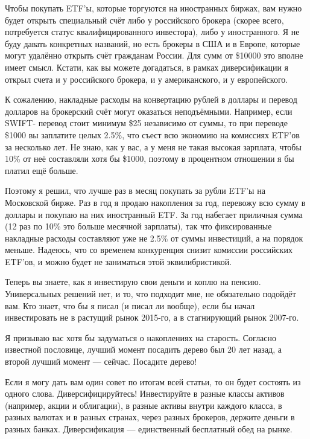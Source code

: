 Чтобы покупать ETF'ы, которые торгуются на иностранных биржах, вам нужно будет 
открыть специальный счёт либо у российского брокера (скорее всего, потребуется 
статус квалифицированного инвестора), либо у иностранного. Я не буду давать 
конкретных названий, но есть брокеры в США и в Европе, которые могут удалённо 
открыть счёт гражданам России. Для сумм от \$\num{10 000} это вполне имеет 
смысл. Кстати, как вы можете догадаться, в рамках диверсификации я открыл счета 
и у российского брокера, и у американского, и у европейского.

К сожалению, накладные расходы на конвертацию рублей в доллары и перевод 
долларов на брокерский счёт могут оказаться неподъёмными. Например, если SWIFT-
перевод стоит минимум \$25 независимо от суммы, то при переводе \$\num{1000} вы 
заплатите целых 2.5\%, что съест всю экономию на комиссиях ETF'ов за несколько 
лет. Не знаю, как у вас, а у меня не такая высокая зарплата, чтобы 10\% от неё 
составляли хотя бы \$\num{1000}, поэтому в процентном отношении я бы платил ещё 
больше.

Поэтому я решил, что лучше раз в месяц покупать за рубли ETF'ы на Московской 
бирже. Раз в год я продаю накопления за год, перевожу всю сумму в доллары и 
покупаю на них иностранный ETF. За год набегает приличная сумма (12 раз по 10\% 
это больше месячной зарплаты), так что фиксированные накладные расходы 
составляют уже не 2.5\% от суммы инвестиций, а на порядок меньше. Надеюсь, что 
со временем конкуренция снизит комиссии российских ETF'ов, и можно будет не 
заниматься этой эквилибристикой.

Теперь вы знаете, как я инвестирую свои деньги и коплю на пенсию. Универсальных 
решений нет, и то, что подходит мне, не обязательно подойдёт вам. Кто знает, 
что бы я писал (и писал ли вообще), если бы начал инвестировать не в растущий 
рынок 2015-го, а в стагнирующий рынок 2007-го.

Я призываю вас хотя бы задуматься о накоплениях на старость. Согласно известной 
пословице, лучший момент посадить дерево был 20 лет назад, а второй лучший 
момент --- сейчас. Посадите дерево!


Если я могу дать вам один совет по итогам всей статьи, то он будет состоять из 
одного слова. Диверсифицируйтесь! Инвестируйте в разные классы активов 
(например, акции и облигации), в разные активы внутри каждого класса, в разных
валютах и в разных странах, через разных брокеров, держите деньги в разных 
банках. Диверсификация --- единственный бесплатный обед на рынке.

